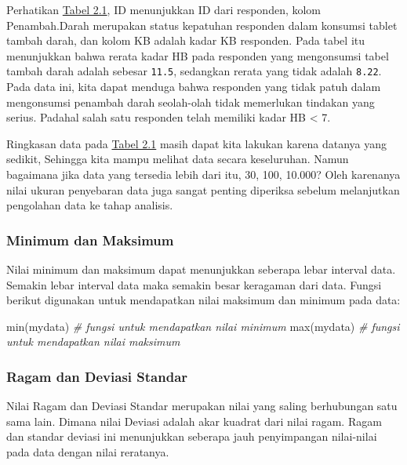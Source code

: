 \documentclass[
]{book}
\newenvironment{Shaded}{\begin{snugshade}}{\end{snugshade}}
\newcommand{\CommentTok}[1]{\textcolor[rgb]{0.56,0.35,0.01}{\textit{#1}}}
\newcommand{\FunctionTok}[1]{\textcolor[rgb]{0.00,0.00,0.00}{#1}}
\newcommand{\NormalTok}[1]{#1}
\begin{document}
Perhatikan \protect\hyperlink{tab:a2-tab1}{Tabel 2.1}, ID menunjukkan ID dari responden, kolom Penambah.Darah merupakan status kepatuhan responden dalam konsumsi tablet tambah darah, dan kolom KB adalah kadar KB responden. Pada tabel itu menunjukkan bahwa rerata kadar HB pada responden yang mengonsumsi tabel tambah darah adalah sebesar \texttt{11.5}, sedangkan rerata yang tidak adalah \texttt{8.22}. Pada data ini, kita dapat menduga bahwa responden yang tidak patuh dalam mengonsumsi penambah darah seolah-olah tidak memerlukan tindakan yang serius. Padahal salah satu responden telah memiliki kadar HB \textless{} 7.

Ringkasan data pada \protect\hyperlink{tab:a2-tab1}{Tabel 2.1} masih dapat kita lakukan karena datanya yang sedikit, Sehingga kita mampu melihat data secara keseluruhan. Namun bagaimana jika data yang tersedia lebih dari itu, 30, 100, 10.000? Oleh karenanya nilai ukuran penyebaran data juga sangat penting diperiksa sebelum melanjutkan pengolahan data ke tahap analisis.

\hypertarget{minimum-dan-maksimum}{%
\subsubsection{Minimum dan Maksimum}\label{minimum-dan-maksimum}}

Nilai minimum dan maksimum dapat menunjukkan seberapa lebar interval data. Semakin lebar interval data maka semakin besar keragaman dari data. Fungsi berikut digunakan untuk mendapatkan nilai maksimum dan minimum pada data:

\begin{Shaded}
\begin{Highlighting}[]
\FunctionTok{min}\NormalTok{(mydata) }\CommentTok{\# fungsi untuk mendapatkan nilai minimum}
\FunctionTok{max}\NormalTok{(mydata) }\CommentTok{\# fungsi untuk mendapatkan nilai maksimum}
\end{Highlighting}
\end{Shaded}

\hypertarget{ragam-dan-deviasi-standar}{%
\subsubsection{Ragam dan Deviasi Standar}\label{ragam-dan-deviasi-standar}}

Nilai Ragam dan Deviasi Standar merupakan nilai yang saling berhubungan satu sama lain. Dimana nilai Deviasi adalah akar kuadrat dari nilai ragam. Ragam dan standar deviasi ini menunjukkan seberapa jauh penyimpangan nilai-nilai pada data dengan nilai reratanya.
\end{document}
